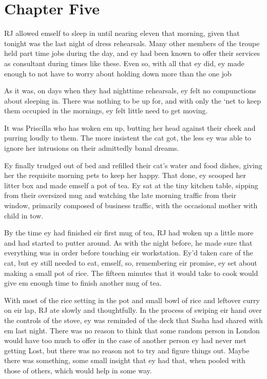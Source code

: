 \chapter*{Chapter Five}

RJ allowed emself to sleep in until nearing eleven that morning, given that tonight was the last night of dress rehearsals. Many other members of the troupe held part time jobs during the day, and ey had been known to offer their services as consultant during times like these. Even so, with all that ey did, ey made enough to not have to worry about holding down more than the one job

As it was, on days when they had nighttime rehearsals, ey felt no compunctions about sleeping in. There was nothing to be up for, and with only the `net to keep them occupied in the mornings, ey felt little need to get moving.

It was Priscilla who has woken em up, butting her head against their cheek and purring loudly to them. The more insistent the cat got, the less ey was able to ignore her intrusions on their admittedly banal dreams.

Ey finally trudged out of bed and refilled their cat's water and food dishes, giving her the requisite morning pets to keep her happy. That done, ey scooped her litter box and made emself a pot of tea. Ey sat at the tiny kitchen table, sipping from their oversized mug and watching the late morning traffic from their window, primarily composed of business traffic, with the occasional mother with child in tow.

By the time ey had finished eir first mug of tea, RJ had woken up a little more and had started to putter around. As with the night before, he made sure that everything was in order before touching eir workstation. Ey'd taken care of the cat, but ey still needed to eat, emself, so, remembering eir promise, ey set about making a small pot of rice. The fifteen minutes that it would take to cook would give em enough time to finish another mug of tea.

With most of the rice setting in the pot and small bowl of rice and leftover curry on eir lap, RJ ate slowly and thoughtfully. In the process of swiping eir hand over the controls of the stove, ey was reminded of the deck that Sasha had shared with em last night. There was no reason to think that some random person in London would have too much to offer in the case of another person ey had never met getting Lost, but there was no reason not to try and figure things out. Maybe there was something, some small insight that ey had that, when pooled with those of others, which would help in some way.

